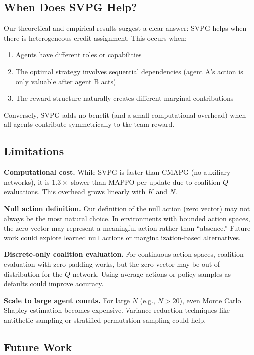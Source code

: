 \documentclass[11pt,a4paper]{article}
\begin{document}
\subsection{When Does SVPG Help?}

Our theoretical and empirical results suggest a clear answer: SVPG helps when there is heterogeneous credit assignment. This occurs when:
\begin{enumerate}[leftmargin=*]
    \item Agents have different roles or capabilities
    \item The optimal strategy involves sequential dependencies (agent A's action is only valuable after agent B acts)
    \item The reward structure naturally creates different marginal contributions
\end{enumerate}
Conversely, SVPG adds no benefit (and a small computational overhead) when all agents contribute symmetrically to the team reward.

\subsection{Limitations}

\textbf{Computational cost.} While SVPG is faster than CMAPG (no auxiliary networks), it is $1.3\times$ slower than MAPPO per update due to coalition $Q$-evaluations. This overhead grows linearly with $K$ and $N$.

\textbf{Null action definition.} Our definition of the null action (zero vector) may not always be the most natural choice. In environments with bounded action spaces, the zero vector may represent a meaningful action rather than ``absence.'' Future work could explore learned null actions or marginalization-based alternatives.

\textbf{Discrete-only coalition evaluation.} For continuous action spaces, coalition evaluation with zero-padding works, but the zero vector may be out-of-distribution for the $Q$-network. Using average actions or policy samples as defaults could improve accuracy.

\textbf{Scale to large agent counts.} For large $N$ (e.g., $N > 20$), even Monte Carlo Shapley estimation becomes expensive. Variance reduction techniques like antithetic sampling or stratified permutation sampling could help.

\subsection{Future Work}
\end{document}
